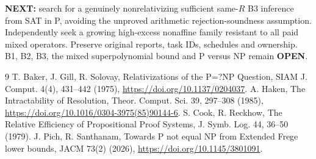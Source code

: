 \documentclass[11pt]{article}
\begin{document}
\noindent\textbf{NEXT:} search for a genuinely nonrelativizing sufficient same-$R$ B3 inference from SAT in P, avoiding the unproved arithmetic rejection-soundness assumption. Independently seek a growing high-excess nonaffine family resistant to all paid mixed operators. Preserve original reports, task IDs, schedules and ownership. B1, B2, B3, the mixed superpolynomial bound and P versus NP remain \textbf{OPEN}.
\begin{thebibliography}{9}
 T. Baker, J. Gill, R. Solovay, Relativizations of the P=?NP Question, SIAM J. Comput. 4(4), 431--442 (1975), \url{https://doi.org/10.1137/0204037}.
 A. Haken, The Intractability of Resolution, Theor. Comput. Sci. 39, 297--308 (1985), \url{https://doi.org/10.1016/0304-3975(85)90144-6}.
 S. Cook, R. Reckhow, The Relative Efficiency of Propositional Proof Systems, J. Symb. Log. 44, 36--50 (1979).
 J. Pich, R. Santhanam, Towards P not equal NP from Extended Frege lower bounds, JACM 73(2) (2026), \url{https://doi.org/10.1145/3801091}.
\end{thebibliography}
\end{document}
